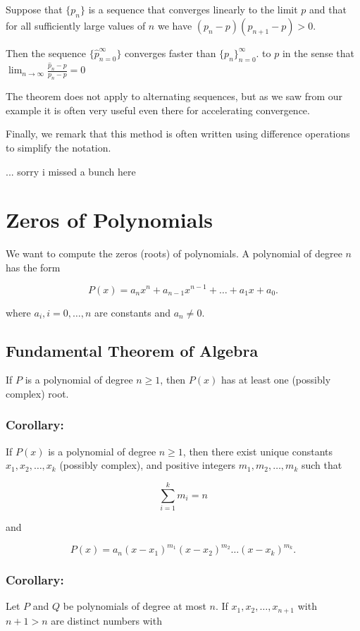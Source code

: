 Suppose that $\{ p_n \}$ is a sequence that converges linearly to the limit $p$
and that for all sufficiently large values of $n$ we have $(p_n-p)(p_{n+1}-p) > 0$.

Then the sequence $\{ \hat{p}_{n=0}^\infty \}$ converges faster than $\{ p_n \}_{n=0}^\infty$.
to $p$ in the sense that $\displaystyle \lim_{n\to\infty} \frac{\hat{p}_n - p}{p_n-p} = 0$

The theorem does not apply to alternating sequences, but as we saw from our 
example it is often very useful even there for accelerating convergence.

Finally, we remark that this method is often written using difference operations 
to simplify the notation.

... sorry i missed a bunch here

\section{Zeros of Polynomials}

We want to compute the zeros (roots) of polynomials. A polynomial of degree $n$
has the form

\[
  P(x) = a_nx^n + a_{n-1}x^{n-1} + \dots + a_1x+a_0
.\]

where $a_i , i=0,\dots,n$ are constants and $a_n \neq 0$.

\subsection{Fundamental Theorem of Algebra}

If \( P \) is a polynomial of degree \( n \geq 1 \), then \( P(x) \) has at least one (possibly complex) root.

\subsubsection*{Corollary:}
If \( P(x) \) is a polynomial of degree \( n \geq 1 \), then there exist unique constants \( x_1, x_2, \dots, x_k \) (possibly complex), and positive integers \( m_1, m_2, \dots, m_k \) such that

\[
  \sum_{i=1}^{k} m_i = n
\]

and 

\[
  P(x) = a_n (x - x_1)^{m_1} (x - x_2)^{m_2} \dots (x - x_k)^{m_k}.
\]

\subsubsection*{Corollary:}
Let \( P \) and \( Q \) be polynomials of degree at most \( n \). If \( x_1, x_2, \dots, x_{n+1} \) with \( n+1 > n \) are distinct numbers with 

